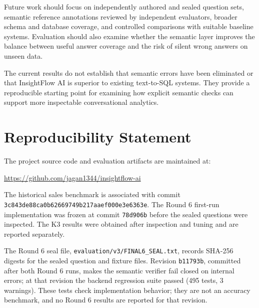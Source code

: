 \documentclass[conference]{IEEEtran}
\begin{document}
Future work should focus on independently authored and sealed question sets, semantic reference annotations reviewed by independent evaluators, broader schema and database coverage, and controlled comparisons with suitable baseline systems. Evaluation should also examine whether the semantic layer improves the balance between useful answer coverage and the risk of silent wrong answers on unseen data.

The current results do not establish that semantic errors have been eliminated or that InsightFlow AI is superior to existing text-to-SQL systems. They provide a reproducible starting point for examining how explicit semantic checks can support more inspectable conversational analytics.

\section*{Reproducibility Statement}

The project source code and evaluation artifacts are maintained at:

\url{https://github.com/jagan1344/insightflow-ai}

The historical sales benchmark is associated with commit \texttt{3c843de88c\allowbreak{}a0b6266974\allowbreak{}9b217aaef0\allowbreak{}00e3e6363e}. The Round 6 first-run implementation was frozen at commit \texttt{78d906b} before the sealed questions were inspected. The K3 results were obtained after inspection and tuning and are reported separately.

The Round 6 seal file, \texttt{evaluation/\allowbreak{}v3/\allowbreak{}FINAL6\_SEAL.txt}, records SHA-256 digests for the sealed question and fixture files. Revision \texttt{b11793b}, committed after both Round 6 runs, makes the semantic verifier fail closed on internal errors; at that revision the backend regression suite passed (495 tests, 3 warnings). These tests check implementation behavior; they are not an accuracy benchmark, and no Round 6 results are reported for that revision.
\end{document}
